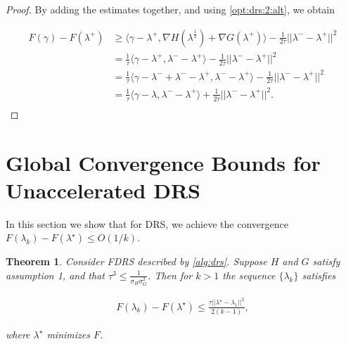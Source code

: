 \documentclass[11pt]{article}
\newcommand{\half}{^{\frac 12}}
\newcommand{\minus}{^-}
\newcommand{\inner}[2]{\langle #1, #2\rangle}
\def\grad {{\nabla}}
\newtheorem{thrm}{Theorem}
\begin{document}
\begin{proof}
By adding the estimates together, and using \cref{opt:drs:2:alt}, we obtain

\begin{align*}
F(\gamma) - F(\lambda^+) &\ge \inner{\gamma - \lambda^+}{\grad H(\lambda\half) + \grad G(\lambda^+)} - \frac 1{2\tau} ||\lambda\minus - \lambda^+||^2 \\
&= \frac 1\tau \inner{\gamma - \lambda^+}{\lambda\minus - \lambda^+} - \frac 1{2\tau} ||\lambda\minus - \lambda^+||^2 \\
&= \frac 1\tau \inner{\gamma - \lambda\minus + \lambda\minus- \lambda^+}{\lambda\minus - \lambda^+} - \frac 1{2\tau} ||\lambda\minus - \lambda^+||^2 \\
&= \frac 1\tau \inner{\gamma - \lambda}{\lambda\minus - \lambda^+} + \frac 1{2\tau} ||\lambda\minus - \lambda^+||^2. \\
\end{align*}
\end{proof}


\section{Global Convergence Bounds for Unaccelerated DRS}

In this section we show that for DRS, we achieve the convergence
$F(\lambda_k) - F(\lambda^\star) \le O(1/k)$.

\begin{thrm}
Consider FDRS described by \cref{alg:drs}.  Suppose $H$ and $G$ satisfy assumption 1, and that $\tau^3 \le \frac 1{\sigma_H\sigma_G^2}$.  Then for $k > 1$ the sequence $\{\lambda_k\}$ satisfies

\begin{align*}
F(\lambda_k) - F(\lambda^\star) \le \frac {\tau ||\lambda^\star - \lambda_1||^2}{2(k-1)},
\end{align*}

\noindent where $\lambda^\star$ minimizes $F$.
\end{thrm}
\end{document}
